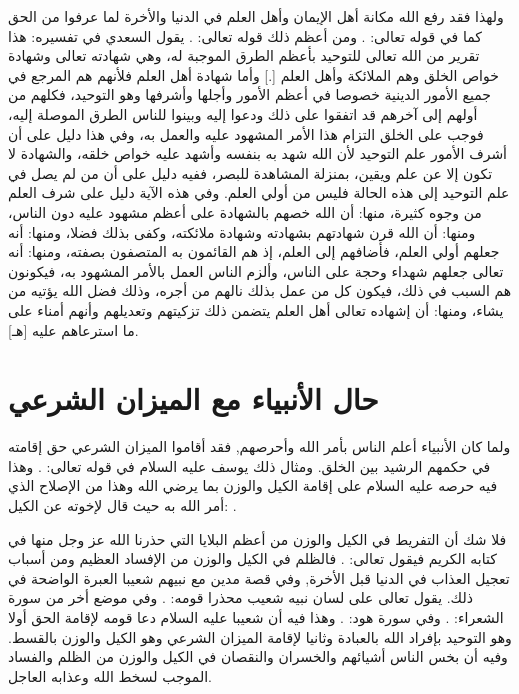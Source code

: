 ولهذا فقد رفع الله مكانة أهل الإيمان وأهل العلم في الدنيا والأخرة لما عرفوا من الحق كما في قوله تعالى:
\quranayah*[58][11][19]{\footnotesize \surahname*[58]}.
ومن أعظم ذلك قوله تعالى:
\quranayah*[3][18]{\footnotesize \surahname*[3]}.
يقول السعدي في تفسيره:
هذا تقرير من الله تعالى للتوحيد بأعظم الطرق الموجبة له، وهي شهادته تعالى وشهادة خواص الخلق وهم الملائكة وأهل العلم [.] وأما شهادة أهل العلم فلأنهم هم المرجع في جميع الأمور الدينية خصوصا في أعظم الأمور وأجلها وأشرفها وهو التوحيد، فكلهم من أولهم إلى آخرهم قد اتفقوا على ذلك ودعوا إليه وبينوا للناس الطرق الموصلة إليه، فوجب على الخلق التزام هذا الأمر المشهود عليه والعمل به، وفي هذا دليل على أن أشرف الأمور علم التوحيد لأن الله شهد به بنفسه وأشهد عليه خواص خلقه، والشهادة لا تكون إلا عن علم ويقين، بمنزلة المشاهدة للبصر، ففيه دليل على أن من لم يصل في علم التوحيد إلى هذه الحالة فليس من أولي العلم. وفي هذه الآية دليل على شرف العلم من وجوه كثيرة، منها: أن الله خصهم بالشهادة على أعظم مشهود عليه دون الناس، ومنها: أن الله قرن شهادتهم بشهادته وشهادة ملائكته، وكفى بذلك فضلا، ومنها: أنه جعلهم أولي العلم، فأضافهم إلى العلم، إذ هم القائمون به المتصفون بصفته، ومنها: أنه تعالى جعلهم شهداء وحجة على الناس، وألزم الناس العمل بالأمر المشهود به، فيكونون هم السبب في ذلك، فيكون كل من عمل بذلك نالهم من أجره، وذلك فضل الله يؤتيه من يشاء، ومنها: أن إشهاده تعالى أهل العلم يتضمن ذلك تزكيتهم وتعديلهم وأنهم أمناء على ما استرعاهم عليه [هـ].

\section{حال الأنبياء مع الميزان الشرعي}

ولما كان الأنبياء أعلم الناس بأمر الله وأحرصهم, فقد أقاموا الميزان الشرعي حق إقامته في حكمهم الرشيد بين الخلق. ومثال ذلك يوسف عليه السلام في قوله تعالى:
\quranayah*[12][55]{\footnotesize \surahname*[12]}.
وهذا فيه حرصه عليه السلام على إقامة الكيل والوزن بما يرضي الله وهذا من الإصلاح الذي أمر الله به حيث قال لإخوته عن الكيل:
\quranayah*[12][59-60]{\footnotesize \surahname*[12]}.

فلا شك أن التفريط في الكيل والوزن من أعظم البلايا التي حذرنا الله عز وجل منها في كتابه الكريم فيقول تعالى:
\quranayah*[83][1-6]{\footnotesize \surahname*[83]}. فالظلم في الكيل والوزن من الإفساد العظيم ومن أسباب تعجيل العذاب في الدنيا قبل الأخرة, وفي قصة مدين مع نبيهم شعيبا العبرة الواضحة في ذلك. يقول تعالى على لسان نبيه شعيب محذرا قومه:
\quranayah*[7][85]{\footnotesize \surahname*[7]}.
وفي موضع أخر من سورة الشعراء:
\quranayah*[26][181-183]{\footnotesize \surahname*[26]}.
وفي سورة هود:
\quranayah*[11][84-85]{\footnotesize \surahname*[11]}. وهذا فيه أن شعيبا عليه السلام دعا قومه لإقامة الحق أولا وهو التوحيد بإفراد الله بالعبادة وثانيا لإقامة الميزان الشرعي وهو الكيل والوزن بالقسط. وفيه أن بخس الناس أشيائهم والخسران والنقصان في الكيل والوزن من الظلم والفساد الموجب لسخط الله وعذابه العاجل.


